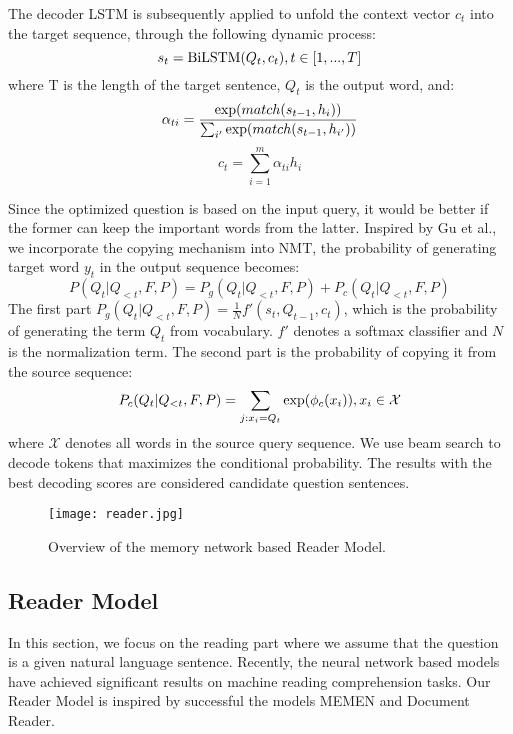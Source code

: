 \documentclass[sigconf]{acmart}
\begin{document}
The decoder LSTM is subsequently applied to unfold the context vector $c_t$ into the target sequence, through the following dynamic process:
$$s_t = {\rm BiLSTM} (Q_t, c_t), t \in [1,...,T]$$
where T is the length of the target sentence, $Q_t$ is the output word, and:
$$\alpha_{ti} = \frac{{\rm exp}(match(s_{t-1}, h_i))}{\sum_{i^{\prime}}{\rm exp}(match(s_{t-1}, h_{i^{\prime}}))}$$
$$c_t = \sum_{i=1}^{m} \alpha_{ti} h_i$$

Since the optimized question is based on the input query, it would be better if the former can keep the important words from the latter. Inspired by Gu et al.\cite{Gu2016Incorporating}, we incorporate the copying mechanism into NMT, the probability of generating target word $y_t$ in the output sequence becomes:
$$P(Q_t|Q_{<t},F,P) = P_g(Q_t|Q_{<t},F,P) + P_c(Q_t|Q_{<t},F,P) $$
The first part $P_g(Q_t|Q_{<t},F,P) = \frac{1}{N}f'(s_t, Q_{t-1}, c_t)$, which is the probability of generating the term $Q_t$ from vocabulary. $f'$ denotes a softmax classifier and $N$ is the normalization term. The second part is the probability of copying it from the source sequence:
$$P_c(Q_t|Q_{<t},F,P) = \sum_{j:x_i = Q_t}{\rm exp}(\phi_c(x_i)), x_i \in \mathcal{X}$$
where $\mathcal{X}$ denotes all words in the source query sequence. We use beam search to decode tokens that maximizes the conditional probability. The results with the best decoding scores are considered candidate question sentences.


\begin{figure*}[t]
  \begin{center}
  \texttt{[image: reader.jpg]}
  \caption{Overview of the memory network based Reader Model.}
  \end{center}
\end{figure*}



\subsection{Reader Model} 
In this section, we focus on the reading part where we assume that the question is a given natural language sentence. Recently, the neural network based models have achieved significant results on machine reading comprehension tasks. Our Reader Model is inspired by successful the models MEMEN\cite{pan2017memen} and Document Reader\cite{Chen2017Reading}.
\end{document}
